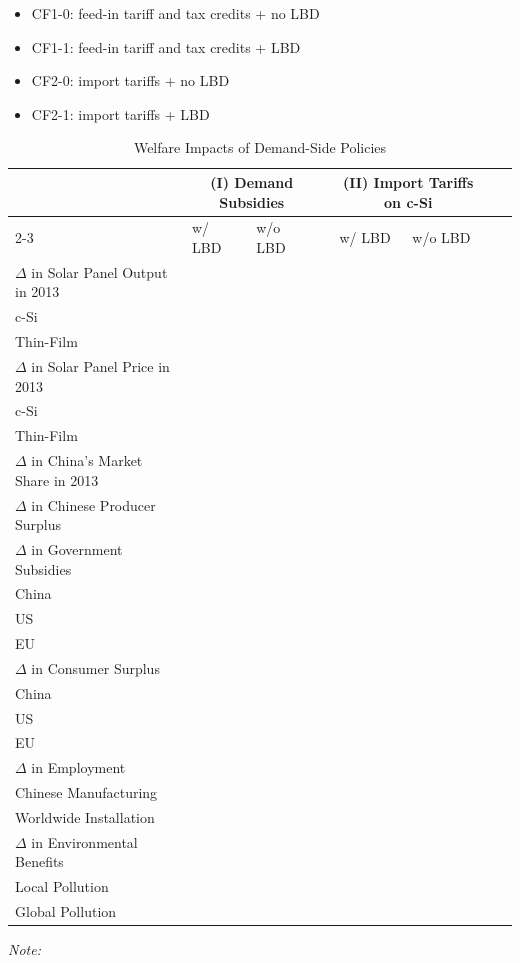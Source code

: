\documentclass[12pt, letter]{article}
\begin{document}
\begin{itemize}
    \item CF1-0: feed-in tariff and tax credits + no LBD
    \item CF1-1: feed-in tariff and tax credits + LBD
    \item CF2-0: import tariffs + no LBD
    \item CF2-1: import tariffs + LBD
\end{itemize} 

\begin{table}[tbh]
\centering
\caption{Welfare Impacts of Demand-Side Policies}
\label{tab:cf_demand_policy}
\begin{threeparttable}
\begin{tabularx}{1.0\textwidth}{Xlllllll}
\toprule
 & \multicolumn{2}{c}{(I) Demand Subsidies } && \multicolumn{2}{c}{(II) Import Tariffs on c-Si } \\
\cmidrule{2-3} \cmidrule{5-6}
 & w/ LBD & w/o LBD && w/ LBD & w/o LBD \\
\midrule
$\Delta$ in Solar Panel Output in 2013 &  &  &&  &  \\
\quad\quad c-Si &  &  &&  &  \\
\quad\quad Thin-Film &  &  &&  &  \\
$\Delta$ in Solar Panel Price in 2013 &  &  &&  &  \\
\quad\quad c-Si &  &  &&  &  \\
\quad\quad Thin-Film &  &  &&  &  \\
$\Delta$ in China's Market Share in 2013 &  &  &&  &  \\
$\Delta$ in Chinese Producer Surplus &  &  &&  &  \\
$\Delta$ in Government Subsidies &  &  &&  &  \\
\quad\quad China &  &  &&  &  \\
\quad\quad US &  &  &&  &  \\
\quad\quad EU &  &  &&  &  \\
$\Delta$ in Consumer Surplus &  &  &&  &  \\
\quad\quad China &  &  &&  &  \\
\quad\quad US &  &  &&  &  \\
\quad\quad EU &  &  &&  &  \\
$\Delta$ in Employment &  &  &&  &  \\
\quad\quad Chinese Manufacturing & &   &&  &  \\
\quad\quad Worldwide Installation & &   &&  &  \\
$\Delta$ in Environmental Benefits &  &  &&  &  \\
\quad\quad Local Pollution & &  &&  &  \\
\quad\quad Global Pollution & &  &&  &  \\
\bottomrule
\end{tabularx}
\begin{tablenotes}
  \item \textit{Note:} 
\end{tablenotes}
\end{threeparttable}
\end{table}
\end{document}
